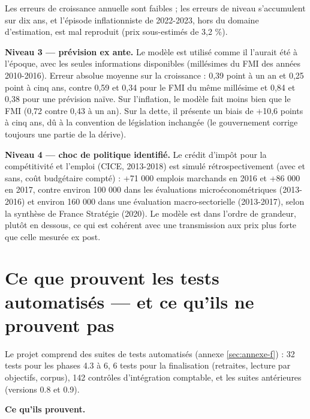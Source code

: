 \documentclass[
  11pt,
  11pt,
  a4paper,
  openany]{book}
\begin{document}
Les erreurs de croissance annuelle sont faibles ; les erreurs de niveau
s'accumulent sur dix ans, et l'épisode inflationniste de 2022-2023, hors
du domaine d'estimation, est mal reproduit (prix sous-estimés de 3,2
\%).

\textbf{Niveau 3 --- prévision ex ante.} Le modèle est utilisé comme il
l'aurait été à l'époque, avec les seules informations disponibles
(millésimes du FMI des années 2010-2016). Erreur absolue moyenne sur la
croissance : 0,39 point à un an et 0,25 point à cinq ans, contre 0,59 et
0,34 pour le FMI du même millésime et 0,84 et 0,38 pour une prévision
naïve. Sur l'inflation, le modèle fait moins bien que le FMI (0,72
contre 0,43 à un an). Sur la dette, il présente un biais de +10,6 points
à cinq ans, dû à la convention de législation inchangée (le gouvernement
corrige toujours une partie de la dérive).

\textbf{Niveau 4 --- choc de politique identifié.} Le crédit d'impôt
pour la compétitivité et l'emploi (CICE, 2013-2018) est simulé
rétrospectivement (avec et sans, coût budgétaire compté) : +71 000
emplois marchands en 2016 et +86 000 en 2017, contre environ 100 000
dans les évaluations microéconométriques (2013-2016) et environ 160 000
dans une évaluation macro-sectorielle (2013-2017), selon la synthèse de
France Stratégie (2020). Le modèle est dans l'ordre de grandeur, plutôt
en dessous, ce qui est cohérent avec une transmission aux prix plus
forte que celle mesurée ex post.

\hypertarget{sec:tests}{%
\section{Ce que prouvent les tests automatisés --- et ce qu'ils ne
prouvent pas}\label{sec:tests}}

Le projet comprend des suites de tests automatisés (annexe
\ref{sec:annexe-f}) : 32 tests pour les phases 4.3 à 6, 6 tests pour la
finalisation (retraites, lecture par objectifs, corpus), 142 contrôles
d'intégration comptable, et les suites antérieures (versions 0.8 et
0.9).

\textbf{Ce qu'ils prouvent.}
\end{document}
